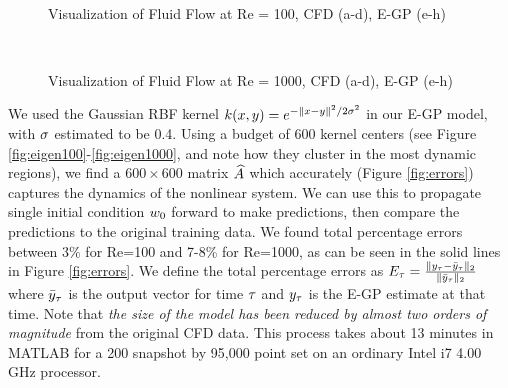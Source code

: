 \begin{figure}[h] %
	\centering
	\\
	
	\caption{Visualization of Fluid Flow at Re = 100, CFD (a-d), E-GP (e-h)}
	\label{fig:cfd_100}
\end{figure}

\begin{figure}[h] %
	\centering
	\\
	\caption{Visualization of Fluid Flow at Re = 1000, CFD (a-d), E-GP (e-h)}
	\label{fig:cfd_1000}
\end{figure}

We used the Gaussian RBF kernel $k(x,y) = e^{-\|x-y\|^2/2\sigma^2}$ in our E-GP model, with $\sigma$ estimated to be 0.4. Using a budget of 600 kernel centers (see Figure \ref{fig:eigen100}-\ref{fig:eigen1000}, and note how they cluster in the most dynamic regions), we find a $600\times600$ matrix $\widehat{A}$ which accurately (Figure \ref{fig:errors}) captures the dynamics of the nonlinear system. We can use this to propagate single initial condition $w_{0}$ forward to make predictions, then compare the predictions to the original training data. We found total percentage errors between 3\% for Re=100 and 7-8\% for Re=1000, as can be seen in the solid lines in Figure \ref{fig:errors}. We define the total percentage errors as
$E_\tau = \frac{\|y_\tau-\bar y_\tau\|_2}{\|\bar y_\tau\|_2}$
where $\bar y_\tau$ is the output vector for time $\tau$ and $y_\tau$ is the E-GP estimate at that time. Note that \emph{the size of the model has been reduced by almost two orders of magnitude} from the original CFD data. This process takes about 13 minutes in MATLAB for a 200 snapshot by 95,000 point set on an ordinary Intel i7 4.00 GHz processor.

